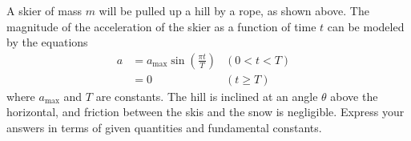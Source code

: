 \documentclass{../../oss-apphys-exam}
\begin{document}
\begin{questions}

  \question A skier of mass $m$ will be pulled up a hill by a rope, as shown
  above. The magnitude of the acceleration of the skier as a function of time
  $t$ can be modeled by the equations
  \begin{align*}
    a &=a_\text{max}\sin\left(\frac{\pi t}T\right)  &(0<t<T)&\\
    &=0 & (t\geq T)&
  \end{align*}
  where $a_\text{max}$ and $T$ are constants. The hill is inclined at an angle
  $\theta$ above the horizontal, and friction between the skis and the snow is
  negligible. Express your answers in terms of given quantities and fundamental
  constants.
\end{questions}
\end{document}
